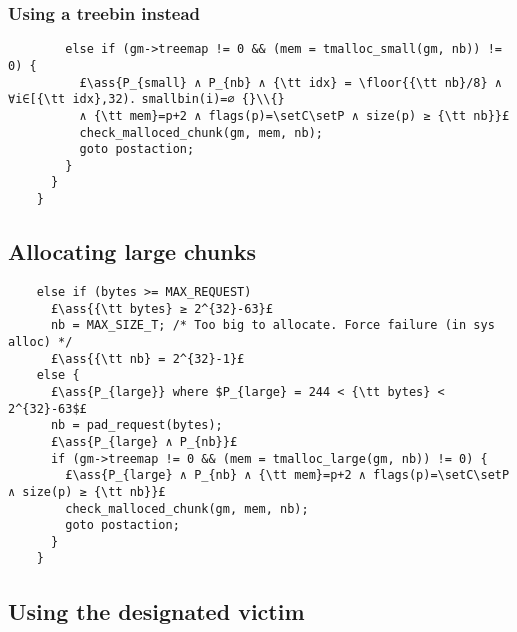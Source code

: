 \documentclass[10pt,twoside]{report}
\makeatletter
\newcommand{\ml}[2][t]{\mbox{\mdseries\begin{tabular}[#1]{@{}L@{}}#2\end{tabular}}}
\newcommand{\ass}[1]{\ensuremath{{\color{blue}\left\{\ml[c]{#1}\right\}}}}
\renewcommand{\floor}[2][]{\left\lfloor{#2}\right\rfloor_{#1}}
\newcommand{\setC}{\raisebox{1.5pt}{$\blacktriangledown$}}
\newcommand{\setP}{{\blacktriangle}}
\makeatother
\begin{document}
\subsubsection*{Using a treebin instead}\label{sect:using_a_treebin_instead}

\begin{lstlisting}
        else if (gm->treemap != 0 && (mem = tmalloc_small(gm, nb)) != 0) {
          £\ass{P_{small} ∧ P_{nb} ∧ {\tt idx} = \floor{{\tt nb}/8} ∧ ∀i∈[{\tt idx},32)．smallbin(i)=∅ {}\\{}
          ∧ {\tt mem}=p+2 ∧ flags(p)=\setC\setP ∧ size(p) ≥ {\tt nb}}£
          check_malloced_chunk(gm, mem, nb);
          goto postaction;
        }
      }
    }
\end{lstlisting}

\subsection*{Allocating large chunks}\label{sect:allocating_large_chunks}

\begin{lstlisting}
    else if (bytes >= MAX_REQUEST)
      £\ass{{\tt bytes} ≥ 2^{32}-63}£
      nb = MAX_SIZE_T; /* Too big to allocate. Force failure (in sys alloc) */
      £\ass{{\tt nb} = 2^{32}-1}£
    else {
      £\ass{P_{large}} where $P_{large} = 244 < {\tt bytes} < 2^{32}-63$£
      nb = pad_request(bytes);
      £\ass{P_{large} ∧ P_{nb}}£
      if (gm->treemap != 0 && (mem = tmalloc_large(gm, nb)) != 0) {
        £\ass{P_{large} ∧ P_{nb} ∧ {\tt mem}=p+2 ∧ flags(p)=\setC\setP ∧ size(p) ≥ {\tt nb}}£
        check_malloced_chunk(gm, mem, nb);
        goto postaction;
      }
    }
\end{lstlisting}

\subsection*{Using the designated victim}\label{sect:using_the_designated_victim}
\end{document}
